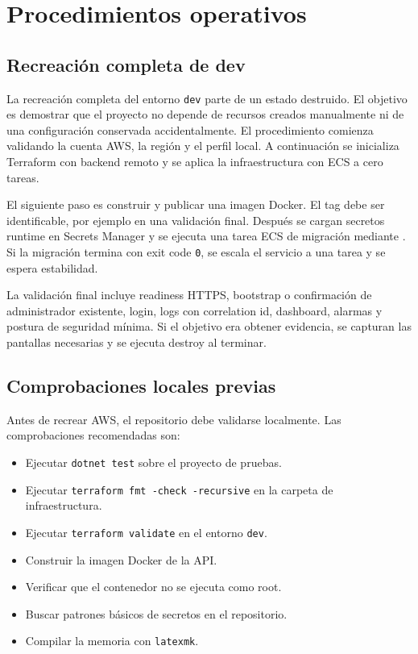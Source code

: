 \chapter{Procedimientos operativos}
\label{chap:anexo-procedimientos}

\section{Recreación completa de dev}
\label{sec:anexo-recreate-dev}

La recreación completa del entorno \texttt{dev} parte de un estado destruido. El objetivo es demostrar que el proyecto no depende de recursos creados manualmente ni de una configuración conservada accidentalmente. El procedimiento comienza validando la cuenta AWS, la región y el perfil local. A continuación se inicializa Terraform con backend remoto y se aplica la infraestructura con ECS a cero tareas.

El siguiente paso es construir y publicar una imagen Docker. El tag debe ser identificable, por ejemplo  en una validación final. Después se cargan secretos runtime en Secrets Manager y se ejecuta una tarea ECS de migración mediante . Si la migración termina con exit code \texttt{0}, se escala el servicio a una tarea y se espera estabilidad.

La validación final incluye readiness HTTPS, bootstrap o confirmación de administrador existente, login, logs con correlation id, dashboard, alarmas y postura de seguridad mínima. Si el objetivo era obtener evidencia, se capturan las pantallas necesarias y se ejecuta destroy al terminar.

\section{Comprobaciones locales previas}
\label{sec:anexo-local-checks}

Antes de recrear AWS, el repositorio debe validarse localmente. Las comprobaciones recomendadas son:

\begin{itemize}
  \item Ejecutar \texttt{dotnet test} sobre el proyecto de pruebas.
  \item Ejecutar \texttt{terraform fmt -check -recursive} en la carpeta de infraestructura.
  \item Ejecutar \texttt{terraform validate} en el entorno \texttt{dev}.
  \item Construir la imagen Docker de la API.
  \item Verificar que el contenedor no se ejecuta como root.
  \item Buscar patrones básicos de secretos en el repositorio.
  \item Compilar la memoria con \texttt{latexmk}.
\end{itemize}

